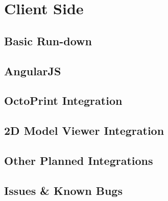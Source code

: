 \chapter{Client Side}
\section{Basic Run-down}
\section{AngularJS}
\section{OctoPrint Integration}
\section{2D Model Viewer Integration}
\section{Other Planned Integrations}
\section{Issues \& Known Bugs}


